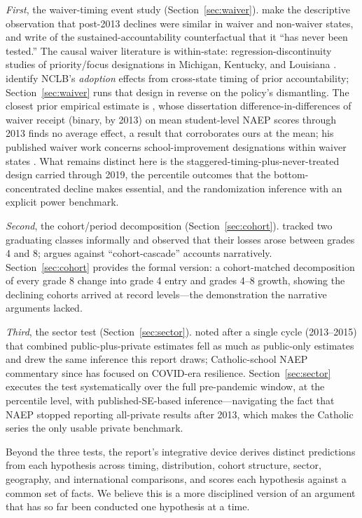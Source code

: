 \documentclass[11pt]{article}
\begin{document}
\emph{First}, the waiver-timing event study (Section~\ref{sec:waiver}). \citet{dewey2026} make the descriptive observation that post-2013 declines were similar in waiver and non-waiver states, and write of the sustained-accountability counterfactual that it ``has never been tested.'' The causal waiver literature is within-state: regression-discontinuity studies of priority/focus designations in Michigan, Kentucky, and Louisiana \citep{hemeltjacob2020,deedizonross2019}. \citet{deejacob2011} identify NCLB's \emph{adoption} effects from cross-state timing of prior accountability; Section~\ref{sec:waiver} runs that design in reverse on the policy's dismantling. The closest prior empirical estimate is \citet{bleiberg2020}, whose dissertation difference-in-differences of waiver receipt (binary, by 2013) on mean student-level NAEP scores through 2013 finds no average effect, a result that corroborates ours at the mean; his published waiver work concerns school-improvement designations within waiver states \citep{bleiberg2026}. What remains distinct here is the staggered-timing-plus-never-treated design carried through 2019, the percentile outcomes that the bottom-concentrated decline makes essential, and the randomization inference with an explicit power benchmark.

\emph{Second}, the cohort/period decomposition (Section~\ref{sec:cohort}). \citet{petrilli2020} tracked two graduating classes informally and observed that their losses arose between grades 4 and 8; \citet{malkus2025theories} argues against ``cohort-cascade'' accounts narratively. Section~\ref{sec:cohort} provides the formal version: a cohort-matched decomposition of every grade 8 change into grade 4 entry and grades 4--8 growth, showing the declining cohorts arrived at record levels---the demonstration the narrative arguments lacked.

\emph{Third}, the sector test (Section~\ref{sec:sector}). \citet{malkus2015} noted after a single cycle (2013--2015) that combined public-plus-private estimates fell as much as public-only estimates and drew the same inference this report draws; Catholic-school NAEP commentary since has focused on COVID-era resilience. Section~\ref{sec:sector} executes the test systematically over the full pre-pandemic window, at the percentile level, with published-SE-based inference---navigating the fact that NAEP stopped reporting all-private results after 2013, which makes the Catholic series the only usable private benchmark.

Beyond the three tests, the report's integrative device derives distinct predictions from each hypothesis across timing, distribution, cohort structure, sector, geography, and international comparisons, and scores each hypothesis against a common set of facts. We believe this is a more disciplined version of an argument that has so far been conducted one hypothesis at a time.
\end{document}
